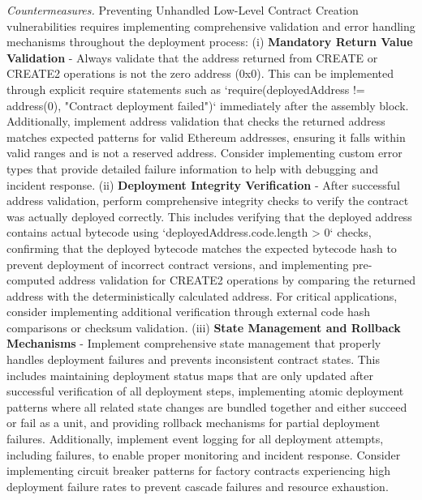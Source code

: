 \documentclass[acmsmall, screen]{acmart}
\begin{document}
	\textit{Countermeasures.} Preventing Unhandled Low-Level Contract Creation vulnerabilities
	requires implementing comprehensive validation and error handling mechanisms throughout the
	deployment process: (i) \textbf{Mandatory Return Value Validation} - Always validate that the
	address returned from CREATE or CREATE2 operations is not the zero address (0x0). This can be implemented
	through explicit require statements such as `require(deployedAddress != address(0), "Contract
	deployment failed")` immediately after the assembly block. Additionally, implement address validation
	that checks the returned address matches expected patterns for valid Ethereum addresses,
	ensuring it falls within valid ranges and is not a reserved address. Consider implementing custom
	error types that provide detailed failure information to help with debugging and incident response.
	(ii) \textbf{Deployment Integrity Verification} - After successful address validation, perform
	comprehensive integrity checks to verify the contract was actually deployed correctly. This includes
	verifying that the deployed address contains actual bytecode using `deployedAddress.code.length
	> 0` checks, confirming that the deployed bytecode matches the expected bytecode hash to prevent
	deployment of incorrect contract versions, and implementing pre-computed address validation for CREATE2
	operations by comparing the returned address with the deterministically calculated address. For
	critical applications, consider implementing additional verification through external code hash comparisons
	or checksum validation. (iii) \textbf{State Management and Rollback Mechanisms} - Implement comprehensive
	state management that properly handles deployment failures and prevents inconsistent contract states.
	This includes maintaining deployment status maps that are only updated after successful
	verification of all deployment steps, implementing atomic deployment patterns where all related state
	changes are bundled together and either succeed or fail as a unit, and providing rollback
	mechanisms for partial deployment failures. Additionally, implement event logging for all
	deployment attempts, including failures, to enable proper monitoring and incident response. Consider
	implementing circuit breaker patterns for factory contracts experiencing high deployment failure
	rates to prevent cascade failures and resource exhaustion.
\end{document}

